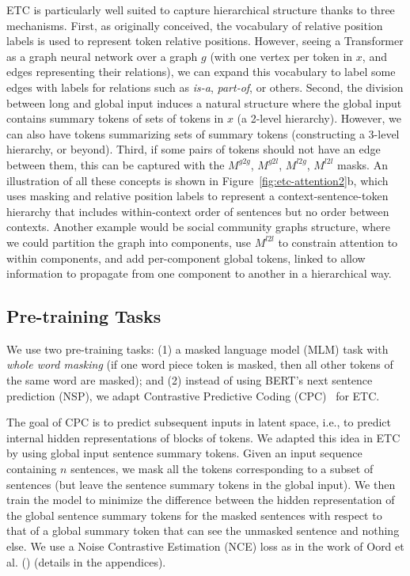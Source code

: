\documentclass[11pt,a4paper]{article}
\begin{document}
ETC is particularly well suited to capture hierarchical structure thanks to three mechanisms. First, as originally conceived, the vocabulary of relative position labels is used to represent token relative positions. However, seeing a Transformer as a graph neural network over a graph $g$ (with one vertex per token in $x$, and edges representing their relations), we can expand this vocabulary to label some edges with labels for relations such as {\em is-a}, {\em part-of}, or others. Second, the division between long and global input induces a natural structure where the global input contains summary tokens of sets of tokens in $x$ (a 2-level hierarchy). However, we can also have tokens summarizing sets of summary tokens (constructing a 3-level hierarchy, or beyond). Third, if some pairs of tokens should not have an edge between them, this can be captured with the $M^{g2g}$, $M^{g2l}$, $M^{l2g}$, $M^{l2l}$ masks. An illustration of all these concepts is shown in Figure~\ref{fig:etc-attention2}b, which uses masking and relative position labels to represent a context-sentence-token hierarchy that includes within-context order of sentences but no order between contexts. 
Another example would be social community graphs structure, where we could partition the graph into components, use $M^{l2l}$ to constrain attention to within components, and add per-component global tokens, linked to allow information to propagate from one component to another in a hierarchical way.







\subsection{Pre-training Tasks}

We use two pre-training tasks: (1) a masked language model (MLM) task with {\em whole word masking} (if one word piece token is masked, then all other tokens of the same word are masked); and (2) instead of using BERT's next sentence prediction (NSP), we adapt Contrastive Predictive Coding (CPC)~\cite{oord2018representation} for ETC. 

The goal of CPC is to predict subsequent inputs in latent space, i.e., to predict internal hidden representations of blocks of tokens. We adapted this idea in ETC by using global input sentence summary tokens. Given an input sequence containing $n$ sentences, we mask all the tokens corresponding to a subset of sentences (but leave the sentence summary tokens in the global input). We then train the model to minimize the difference between the hidden representation of the global sentence summary tokens for the masked sentences with respect to that of a global summary token that can see the unmasked sentence and nothing else. We use a Noise Contrastive Estimation (NCE) loss as in the work of Oord et al. (\citeyear{oord2018representation}) (details in the appendices). 
\end{document}

